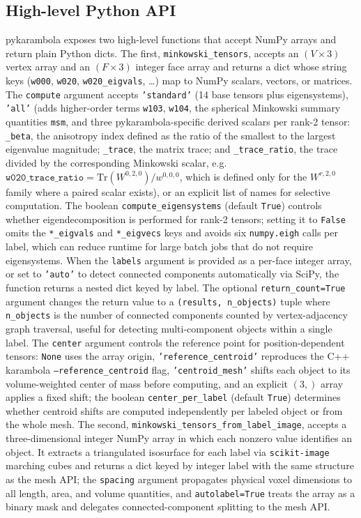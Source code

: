 \documentclass[times, twoside, watermark]{zHenriquesLab-StyleBioRxiv}
\begin{document}
\subsection*{High-level Python API}
pykarambola exposes two high-level functions that accept NumPy arrays and return plain Python dicts.
The first, \texttt{minkowski\_tensors}, accepts an $(V \times 3)$ vertex array and an $(F \times 3)$ integer face array and returns a dict whose string keys (\texttt{w000}, \texttt{w020}, \texttt{w020\_eigvals}, \ldots) map to NumPy scalars, vectors, or matrices.
The \texttt{compute} argument accepts \texttt{'standard'} (14 base tensors plus eigensystems), \texttt{'all'} (adds higher-order terms \texttt{w103}, \texttt{w104}, the spherical Minkowski summary quantities \texttt{msm}, and three pykarambola-specific derived scalars per rank-2 tensor: \texttt{\_beta}, the anisotropy index defined as the ratio of the smallest to the largest eigenvalue magnitude; \texttt{\_trace}, the matrix trace; and \texttt{\_trace\_ratio}, the trace divided by the corresponding Minkowski scalar, e.g.\ $\texttt{w020\_trace\_ratio} = \mathrm{Tr}(W^{0,2,0})/w^{0,0,0}$, which is defined only for the $W^{r,2,0}$ family where a paired scalar exists), or an explicit list of names for selective computation.
The boolean \texttt{compute\_eigensystems} (default \texttt{True}) controls whether eigendecomposition is performed for rank-2 tensors; setting it to \texttt{False} omits the \texttt{*\_eigvals} and \texttt{*\_eigvecs} keys and avoids six \texttt{numpy.eigh} calls per label, which can reduce runtime for large batch jobs that do not require eigensystems.
When the \texttt{labels} argument is provided as a per-face integer array, or set to \texttt{'auto'} to detect connected components automatically via SciPy, the function returns a nested dict keyed by label.
The optional \texttt{return\_count=True} argument changes the return value to a \texttt{(results, n\_objects)} tuple where \texttt{n\_objects} is the number of connected components counted by vertex-adjacency graph traversal, useful for detecting multi-component objects within a single label.
The \texttt{center} argument controls the reference point for position-dependent tensors: \texttt{None} uses the array origin, \texttt{'reference\_centroid'} reproduces the C++ karambola \texttt{--reference\_centroid} flag, \texttt{'centroid\_mesh'} shifts each object to its volume-weighted center of mass before computing, and an explicit $(3,)$ array applies a fixed shift; the boolean \texttt{center\_per\_label} (default \texttt{True}) determines whether centroid shifts are computed independently per labeled object or from the whole mesh.
The second, \texttt{minkowski\_tensors\_from\_label\_image}, accepts a three-dimensional integer NumPy array in which each nonzero value identifies an object.
It extracts a triangulated isosurface for each label via \texttt{scikit-image} marching cubes and returns a dict keyed by integer label with the same structure as the mesh API; the \texttt{spacing} argument propagates physical voxel dimensions to all length, area, and volume quantities, and \texttt{autolabel=True} treats the array as a binary mask and delegates connected-component splitting to the mesh API.
\end{document}

